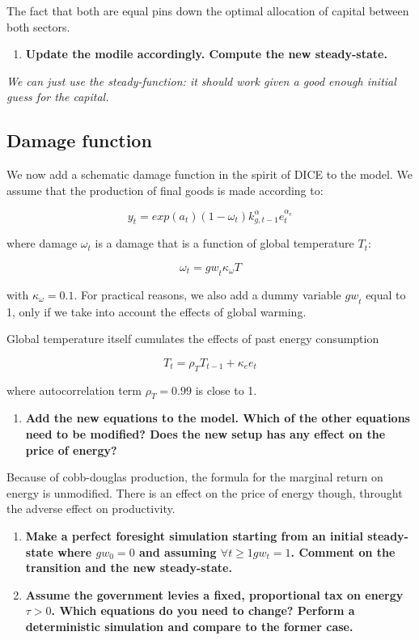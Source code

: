 \documentclass[
  letterpaper,
  DIV=11,
  numbers=noendperiod]{scrartcl}
\providecommand{\tightlist}{%
  \setlength{\itemsep}{0pt}\setlength{\parskip}{0pt}}\usepackage{longtable,booktabs,array}
\begin{document}
The fact that both are equal pins down the optimal allocation of capital
between both sectors.

\begin{enumerate}
\def\labelenumi{\arabic{enumi}.}
\setcounter{enumi}{7}
\tightlist
\item
  \textbf{Update the modile accordingly. Compute the new steady-state.}
\end{enumerate}

\emph{We can just use the steady-function: it should work given a good
enough initial guess for the capital.}

\hypertarget{damage-function}{%
\subsection{Damage function}\label{damage-function}}

We now add a schematic damage function in the spirit of DICE to the
model. We assume that the production of final goods is made according
to:

\[y_t = exp(a_t) (1-\omega_t) k_{g,t-1}^{\alpha}e_t^{\alpha_e}\]

where damage \(\omega_t\) is a damage that is a function of global
temperature \(T_t\):

\[\omega_t = {gw}_t \kappa_{\omega} T\]

with \(\kappa_{\omega} =0.1\). For practical reasons, we also add a
dummy variable \({gw}_t\) equal to 1, only if we take into account the
effects of global warming.

Global temperature itself cumulates the effects of past energy
consumption

\[T_t = \rho_T T_{t-1} +  \kappa_{e}  e_t\]

where autocorrelation term \(\rho_T=0.99\) is close to 1.

\begin{enumerate}
\def\labelenumi{\arabic{enumi}.}
\setcounter{enumi}{8}
\tightlist
\item
  \textbf{Add the new equations to the model. Which of the other
  equations need to be modified? Does the new setup has any effect on
  the price of energy?}
\end{enumerate}

Because of cobb-douglas production, the formula for the marginal return
on energy is unmodified. There is an effect on the price of energy
though, throught the adverse effect on productivity.

\begin{enumerate}
\def\labelenumi{\arabic{enumi}.}
\setcounter{enumi}{9}
\item
  \textbf{Make a perfect foresight simulation starting from an initial
  steady-state where \(gw_0=0\) and assuming
  \(\forall t\geq 1 gw_t = 1\). Comment on the transition and the new
  steady-state.}
\item
  \textbf{Assume the government levies a fixed, proportional tax on
  energy \(\tau>0\). Which equations do you need to change? Perform a
  deterministic simulation and compare to the former case.}
\end{enumerate}
\end{document}
